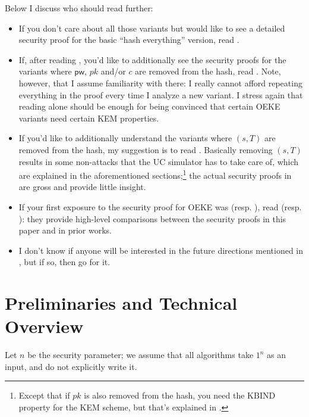 \documentclass{article}
\theoremstyle{plain}
\theoremstyle{definition}
\theoremstyle{remark}
\newcommand{\pw}{\mathsf{pw}}
\begin{document}
Below I discuss who should read further:
\begin{itemize}
  \item If you don't care about all those variants but would like to see a detailed security proof for the basic ``hash everything'' version, read .
  \item If, after reading , you'd like to additionally see the security proofs for the variants where $\pw$, $pk$ and/or $c$ are removed from the hash, read . Note, however, that I assume familiarity with  there: I really cannot afford repeating everything in the proof every time I analyze a new variant. I stress again that reading  alone should be enough for being convinced that certain OEKE variants need certain KEM properties.
  \item If you'd like to additionally understand the variants where $(s,T)$ are removed from the hash, my suggestion is to read . Basically removing $(s,T)$ results in some non-attacks that the UC simulator has to take care of, which are explained in the aforementioned sections;\footnote{Except that if $pk$ is also removed from the hash, you need the KBIND property for the KEM scheme, but that's explained in .} the actual security proofs in  are gross and provide little insight.
  \item If your first exposure to the security proof for OEKE was \cite{EPRINT:ArrBarJar25} (resp. \cite{EC:JanRoyXu25}), read  (resp. ): they provide high-level comparisons between the security proofs in this paper and in prior works.
  \item I don't know if anyone will be interested in the future directions mentioned in , but if so, then go for it.
\end{itemize}

\section{Preliminaries and Technical Overview}
\label{sec:prelim}
Let $n$ be the security parameter; we assume that all algorithms take $1^n$ as an input, and do not explicitly write it.
\end{document}
